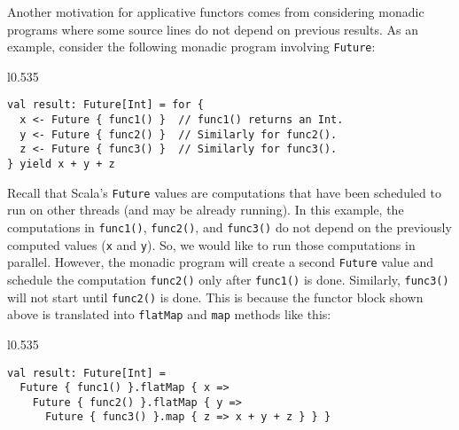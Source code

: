 Another motivation for applicative functors comes from considering
monadic programs where some source lines do not depend on previous
results. As an example, consider the following monadic program involving
\lstinline!Future!:

\begin{wrapfigure}{l}{0.535\columnwidth}%
\vspace{-0.85\baselineskip}
\begin{lstlisting}
val result: Future[Int] = for {
  x <- Future { func1() }  // func1() returns an Int.
  y <- Future { func2() }  // Similarly for func2().
  z <- Future { func3() }  // Similarly for func3().
} yield x + y + z
\end{lstlisting}

\vspace{-1\baselineskip}
\end{wrapfigure}%

\noindent Recall that Scala\textsf{'}s \lstinline!Future! values are computations
that have been scheduled to run on other threads (and may be already
running). In this example, the computations in \lstinline!func1()!,
\lstinline!func2()!, and \lstinline!func3()! do not depend on the
previously computed values (\lstinline!x! and \lstinline!y!). So,
we would like to run those computations in parallel. However, the
monadic program will create a second \lstinline!Future! value and
schedule the computation \lstinline!func2()! only after \lstinline!func1()!
is done. Similarly, \lstinline!func3()! will not start until \lstinline!func2()!
is done. This is because the functor block shown above is translated
into \lstinline!flatMap! and \lstinline!map! methods like this:

\begin{wrapfigure}{l}{0.535\columnwidth}%
\vspace{-0.9\baselineskip}
\begin{lstlisting}
val result: Future[Int] =
  Future { func1() }.flatMap { x =>
    Future { func2() }.flatMap { y =>
      Future { func3() }.map { z => x + y + z } } }
\end{lstlisting}

\vspace{-1.2\baselineskip}
\end{wrapfigure}%

